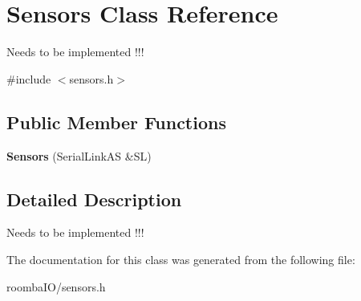 \hypertarget{class_sensors}{}\section{Sensors Class Reference}
\label{class_sensors}


Needs to be implemented !!!  




{\ttfamily \#include $<$sensors.\+h$>$}

\subsection*{Public Member Functions}
\begin{DoxyCompactItemize}
\item 
\mbox{\label{class_sensors_a37514520d7fd6e88dd7178561002987b}} 
{\bfseries Sensors} (Serial\+Link\+AS \&SL)
\end{DoxyCompactItemize}


\subsection{Detailed Description}
Needs to be implemented !!! 

The documentation for this class was generated from the following file\+:\begin{DoxyCompactItemize}
\item 
roomba\+I\+O/sensors.\+h\end{DoxyCompactItemize}
